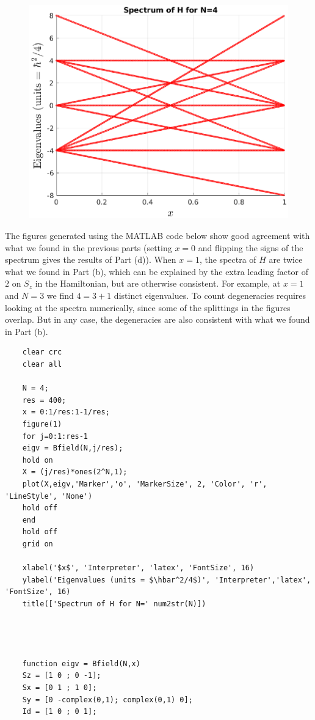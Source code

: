 \documentclass{article}
\theoremstyle{definition}
\begin{document}
\begin{enumerate}[label=(\alph*)]
\begin{figure}[!htb]
\begin{minipage}{0.49\textwidth}
			\includegraphics[width=\textwidth]{2g_N4.eps}
		\end{minipage}
	\end{figure}

	The figures generated using the MATLAB code below show good agreement with what we found in the previous parts (setting $x=0$ and flipping the signs of the spectrum gives the results of Part (d)). When $x=1$, the spectra of $H$ are twice what we found in Part (b), which can be explained by the extra leading factor of $2$ on $S_z$ in the Hamiltonian, but are otherwise consistent. For example, at $x=1$ and $N=3$ we find $4=3+1$ distinct eigenvalues. To count degeneracies requires looking at the spectra numerically, since some of the splittings in the figures overlap. But in any case, the degeneracies are also consistent with what we found in Part (b). 
	\begin{lstlisting}
	clear crc
	clear all
	
	N = 4;
	res = 400;
	x = 0:1/res:1-1/res;
	figure(1)
	for j=0:1:res-1
	eigv = Bfield(N,j/res); 
	hold on
	X = (j/res)*ones(2^N,1);
	plot(X,eigv,'Marker','o', 'MarkerSize', 2, 'Color', 'r', 'LineStyle', 'None')
	hold off
	end
	hold off
	grid on
	
	xlabel('$x$', 'Interpreter', 'latex', 'FontSize', 16)
	ylabel('Eigenvalues (units = $\hbar^2/4$)', 'Interpreter','latex', 'FontSize', 16)
	title(['Spectrum of H for N=' num2str(N)])
	
	
	
	
	function eigv = Bfield(N,x)
	Sz = [1 0 ; 0 -1];
	Sx = [0 1 ; 1 0];
	Sy = [0 -complex(0,1); complex(0,1) 0];
	Id = [1 0 ; 0 1];
	

\end{lstlisting}
\end{enumerate}
\end{document}
